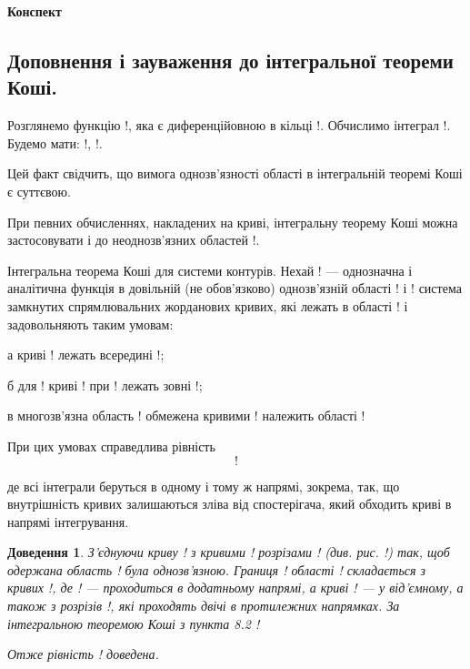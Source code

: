 \documentclass[12pt,fleqn]{article}
\theoremstyle{theorem}
\theoremstyle{proof}
\newtheorem*{dov}{Доведення}
\numberwithin{figure}{section}
\numberwithin{equation}{section}
\begin{document}
\vspace{50mm}

\begin{center}
\Large\bf
Конспект\\[50mm]
{\Huge}
\end{center}

\vspace{50mm}

\newpage

\tableofcontents


\newpage


\subsection{Доповнення і зауваження до інтегральної теореми Коші.}\label{8.4}\allowdisplaybreaks
Розглянемо функцію !, яка є диференційовною в кільці !. Обчислимо інтеграл !. Будемо мати: !, !.
\[ \]

Цей факт свідчить, що вимога однозв'язності області в інтегральній теоремі Коші є суттєвою.

При певних обчисленнях, накладених на криві, інтегральну теорему Коші можна застосовувати і до неоднозв'язних областей !.

Інтегральна теорема Коші для системи контурів. Нехай ! --- однозначна і аналітична функція в довільній (не обов'язково) однозв'язній області ! і ! система замкнутих спрямлювальних жорданових кривих, які лежать в області ! і задовольняють таким умовам:

а криві ! лежать всередині !;

б для ! криві ! при ! лежать зовні !;

в многозв'язна область ! обмежена кривими ! належить області !

При цих умовах справедлива рівність
\begin{equation}\label{8.4.1}
!
\end{equation}

де всі інтеграли беруться в одному і тому ж напрямі, зокрема, так, що внутрішність кривих залишаються зліва від спостерігача, який обходить криві в напрямі інтегрування.

\begin{dov}
З'єднуючи криву ! з кривими ! розрізами ! (див. рис. !) так, щоб одержана область ! була однозв'язною. Границя ! області ! складається з кривих !, де ! --- проходиться в додатньому напрямі, а криві ! --- у від'ємному, а також з розрізів !, які проходять двічі в протилежних напрямках. За інтегральною теоремою Коші з пункта 8.2 !

Отже рівність ! доведена.
\end{dov}
\end{document}
